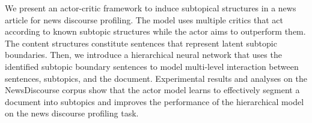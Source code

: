 We present an actor-critic framework to induce subtopical structures in a news article for news discourse profiling. The model uses multiple critics that act according to known subtopic structures while the actor aims to outperform them. The content structures constitute sentences that represent latent subtopic boundaries. Then, we introduce a hierarchical neural network that uses the identified subtopic boundary sentences to model multi-level interaction between sentences, subtopics, and the document. Experimental results and analyses on the NewsDiscourse corpus show that the actor model learns to effectively segment a document into subtopics and improves the performance of the hierarchical model on the news discourse profiling task.
